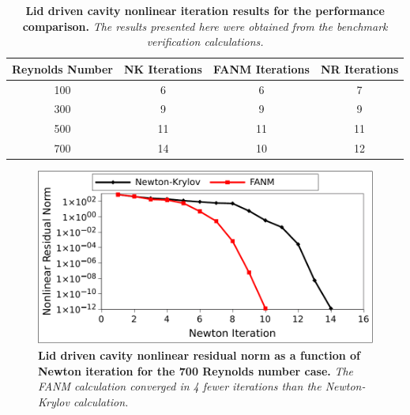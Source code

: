 \begin{table}[h!]
  \begin{center}
    \begin{tabular}{cccc}\hline\hline
      \multicolumn{1}{c}{Reynolds Number}& 
      \multicolumn{1}{c}{NK Iterations}&
      \multicolumn{1}{c}{FANM Iterations}&
      \multicolumn{1}{c}{NR Iterations}\\
      \hline
      100 & 6 & 6 & 7\\
      300 & 9 & 9 & 9\\
      500 & 11 & 11 & 11\\
      700 & 14 & 10 & 12\\
      \hline\hline
    \end{tabular}
  \end{center}
  \caption{\textbf{Lid driven cavity nonlinear iteration
      results for the performance comparison.} \textit{The results
      presented here were obtained from the benchmark verification
      calculations.}}
  \label{tab:driven_nonlinear_iter_comparison}
\end{table}

\begin{figure}[t!]
  \begin{center}
    \includegraphics[width=6in]{chapters/nonlinear_problem/re700_convergence.pdf}
  \end{center}
  \caption{\textbf{Lid driven cavity nonlinear residual norm as a
      function of Newton iteration for the 700 Reynolds number case.}
    \textit{The FANM calculation converged in 4 fewer iterations than
      the Newton-Krylov calculation.}}
  \label{fig:re700_convergence}
\end{figure}

